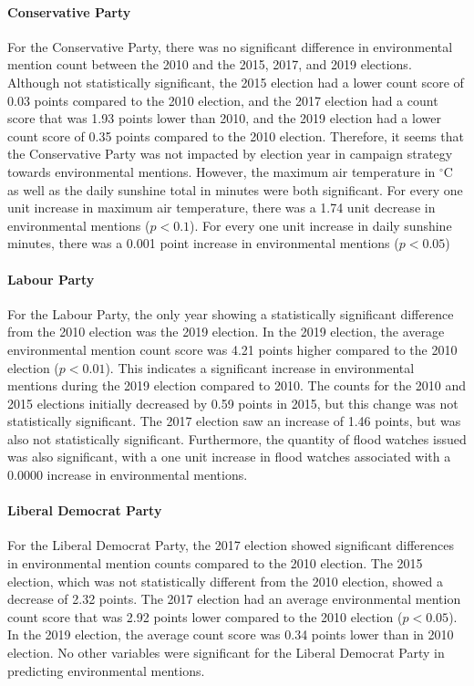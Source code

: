 \documentclass[12pt,letterpaper]{article}
\begin{document}
\paragraph{Conservative Party}

For the Conservative Party, there was no significant difference in environmental mention count between the 2010 and the 2015, 2017, and 2019 elections. Although not statistically significant, the 2015 election had a lower count score of 0.03 points compared to the 2010 election, and the 2017 election had a count score that was 1.93 points lower than 2010, and the 2019 election had a lower count score of 0.35 points compared to the 2010 election. Therefore, it seems that the Conservative Party was not impacted by election year in campaign strategy towards environmental mentions. However, the maximum air temperature in $^\circ$C as well as the daily sunshine total in minutes were both significant. For every one unit increase in maximum air temperature, there was a 1.74 unit decrease in environmental mentions ($p<0.1$). For every one unit increase in daily sunshine minutes, there was a 0.001 point increase in environmental mentions ($p<0.05$)

\paragraph{Labour Party}

For the Labour Party, the only year showing a statistically significant difference from the 2010 election was the 2019 election. In the 2019 election, the average environmental mention count score was 4.21 points higher compared to the 2010 election ($p<0.01$). This indicates a significant increase in environmental mentions during the 2019 election compared to 2010. The counts for the 2010 and 2015 elections initially decreased by 0.59 points in 2015, but this change was not statistically significant. The 2017 election saw an increase of 1.46 points, but was also not statistically significant. Furthermore, the quantity of flood watches issued was also significant, with a one unit increase in flood watches associated with a 0.0000 increase in environmental mentions.

\paragraph{Liberal Democrat Party}

For the Liberal Democrat Party, the 2017 election showed significant differences in environmental mention counts compared to the 2010 election. The 2015 election, which was not statistically different from the 2010 election, showed a decrease of 2.32 points. The 2017 election had an average environmental mention count score that was 2.92 points lower compared to the 2010 election ($p<0.05$). In the 2019 election, the average count score was 0.34 points lower than in 2010 election. No other variables were significant for the Liberal Democrat Party in predicting environmental mentions.
\end{document}
